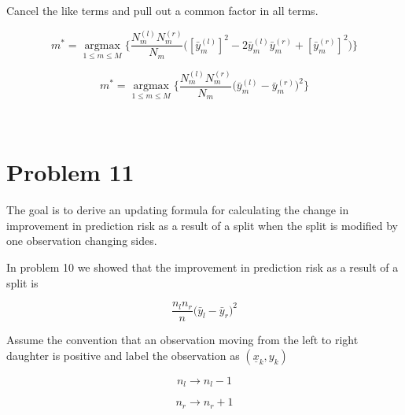 \documentclass[11pt]{article}
\begin{document}
Cancel the like terms and pull out a common factor in all terms. 

\begin{equation}
m^* = \underset{1 \leq m \leq M}{\operatorname{argmax}} 
\Bigg\{\frac{N_m^{(l)}N_m^{(r)}}{N_m}\Big([\bar{y}_m^{(l)}]^2-
2\bar{y}_m^{(l)}\bar{y}_m^{(r)} + [\bar{y}_m^{(r)}]^2\Big)\Bigg \}
\end{equation}

\begin{equation}
m^* = \underset{1 \leq m \leq M}{\operatorname{argmax}} 
\Bigg\{\frac{N_m^{(l)}N_m^{(r)}}{N_m}\Big(\bar{y}_m^{(l)} - 
\bar{y}_m^{(r)}\Big)^2\Bigg \}
\end{equation}

\newpage
\begin{center}
\ \\
\end{center}

\section*{Problem 11}
\setlength{\parindent}{0pt}

The goal is to derive an updating formula for calculating the change in 
improvement  in prediction risk as a result of a split when the split is 
modified by one observation changing sides. 

In problem 10 we showed that the improvement in prediction risk as a result of 
a split is 

$$ \frac{n_ln_r}{n}\big(\bar{y}_l - \bar{y}_r\big)^2$$

Assume the convention that an observation moving from the left to right 
daughter is positive and label the observation as $(\underline{x}_k, y_k)$

\begin{equation}
n_l \rightarrow n_l - 1
\end{equation}

\begin{equation}
n_r \rightarrow n_r + 1
\end{equation}
\end{document}
